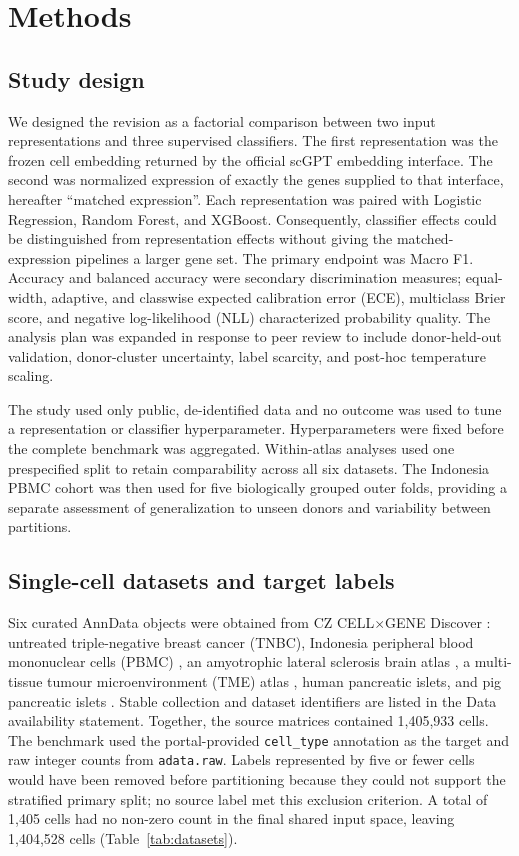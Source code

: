 \section{Methods}

\subsection{Study design}

We designed the revision as a factorial comparison between two input representations and three supervised classifiers. The first representation was the frozen cell embedding returned by the official scGPT embedding interface. The second was normalized expression of exactly the genes supplied to that interface, hereafter ``matched expression''. Each representation was paired with Logistic Regression, Random Forest, and XGBoost. Consequently, classifier effects could be distinguished from representation effects without giving the matched-expression pipelines a larger gene set. The primary endpoint was Macro F1. Accuracy and balanced accuracy were secondary discrimination measures; equal-width, adaptive, and classwise expected calibration error (ECE), multiclass Brier score, and negative log-likelihood (NLL) characterized probability quality. The analysis plan was expanded in response to peer review to include donor-held-out validation, donor-cluster uncertainty, label scarcity, and post-hoc temperature scaling.

The study used only public, de-identified data and no outcome was used to tune a representation or classifier hyperparameter. Hyperparameters were fixed before the complete benchmark was aggregated. Within-atlas analyses used one prespecified split to retain comparability across all six datasets. The Indonesia PBMC cohort was then used for five biologically grouped outer folds, providing a separate assessment of generalization to unseen donors and variability between partitions.

\subsection{Single-cell datasets and target labels}

Six curated AnnData objects were obtained from CZ CELL$\times$GENE Discover \citep{CZICELLxGENE2023}: untreated triple-negative breast cancer (TNBC), Indonesia peripheral blood mononuclear cells (PBMC) \citep{Fachrul2026}, an amyotrophic lateral sclerosis brain atlas \citep{Takeuchi2025}, a multi-tissue tumour microenvironment (TME) atlas \citep{Guimaraes2024}, human pancreatic islets, and pig pancreatic islets \citep{Tritschler2022}. Stable collection and dataset identifiers are listed in the Data availability statement. Together, the source matrices contained 1,405,933 cells. The benchmark used the portal-provided \texttt{cell\_type} annotation as the target and raw integer counts from \texttt{adata.raw}. Labels represented by five or fewer cells would have been removed before partitioning because they could not support the stratified primary split; no source label met this exclusion criterion. A total of 1,405 cells had no non-zero count in the final shared input space, leaving 1,404,528 cells (Table~\ref{tab:datasets}).

